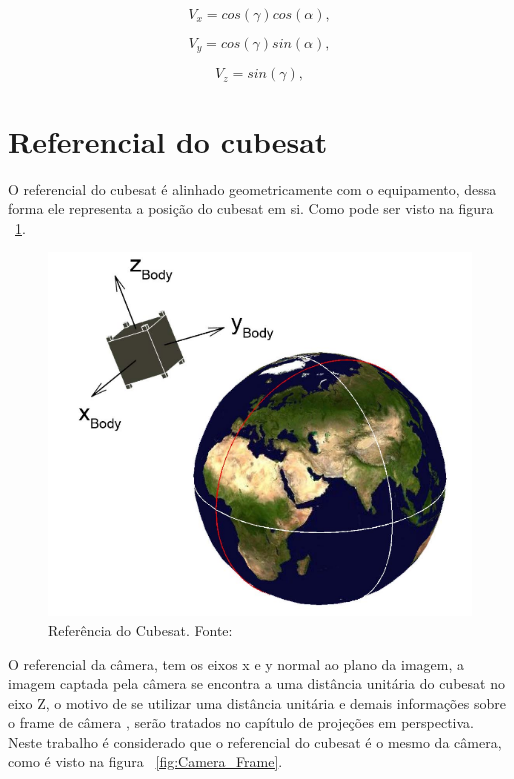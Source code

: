 \begin{equation}
	V_{x}=cos(\gamma)cos(\alpha),
	\label{eq:2}
\end{equation}

\begin{equation}
	V_{y}=cos(\gamma)sin(\alpha),
	\label{eq:3}
\end{equation}

\begin{equation}
	V_{z}=sin(\gamma),
	\label{eq:4}
\end{equation}

\section{Referencial do cubesat}

O referencial do cubesat é alinhado geometricamente com o equipamento, dessa forma ele representa a posição do cubesat em si. Como pode ser visto na figura ~\ref{fig:Referencia_do_Cubesat}.

\begin{figure}[!h]
	\centering
	\includegraphics[width=.7\columnwidth]{images/Referencia_do_Cubesat.png}
	\caption{Referência do Cubesat. Fonte: ~\cite[]{Diaz}}
	\label{fig:Referencia_do_Cubesat}
\end{figure}

O referencial da câmera, tem os eixos x e y normal ao plano da imagem, a imagem captada pela câmera se encontra a uma distância unitária do cubesat no eixo Z, o motivo de se utilizar uma distância unitária e demais informações sobre o frame de câmera , serão tratados no capítulo de projeções em perspectiva. Neste trabalho é considerado que o referencial do cubesat é o mesmo da câmera, como é visto na figura ~\ref{fig:Camera_Frame}.

